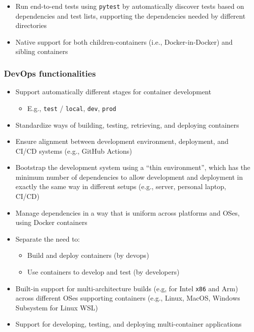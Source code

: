 \documentclass{article}
\begin{document}
\begin{itemize}

  \item Run end-to-end tests using \texttt{pytest} by automatically discover
    tests based on dependencies and test lists, supporting the dependencies needed
    by different directories

  \item Native support for both children-containers (i.e., Docker-in-Docker) and
    sibling containers
\end{itemize}

\subsubsection{DevOps functionalities}

\begin{itemize}

  \item Support automatically different stages for container development

    \begin{itemize}

      \item E.g., \texttt{test} / \texttt{local}, \texttt{dev}, \texttt{prod}
    \end{itemize}

  \item Standardize ways of building, testing, retrieving, and deploying
    containers

  \item Ensure alignment between development environment, deployment, and CI/CD systems
    (e.g., GitHub Actions)

  \item Bootstrap the development system using a ``thin environment'', which has
    the minimum number of dependencies to allow development and deployment in
    exactly the same way in different setups (e.g., server, personal laptop, CI/CD)

  \item Manage dependencies in a way that is uniform across platforms and OSes,
    using Docker containers

  \item Separate the need to:

    \begin{itemize}

      \item Build and deploy containers (by devops)

      \item Use containers to develop and test (by developers)
    \end{itemize}

  \item Built-in support for multi-architecture builds (e.g, for Intel \texttt{x86}
    and Arm) across different OSes supporting containers (e.g., Linux, MacOS,
    Windows Subsystem for Linux WSL)

  \item Support for developing, testing, and deploying multi-container applications
\end{itemize}
\end{document}
